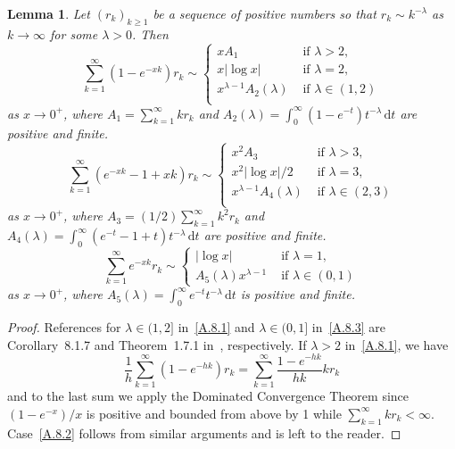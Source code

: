 \documentclass[11pt]{article}
\newtheorem{lemm}[theo]{Lemma}
\theoremstyle{definition}
\numberwithin{equation}{section}
\numberwithin{figure}{section}
\numberwithin{table}{section}
\newcommand{\gl}{\lambda}
\newcommand{\dd}{\mathrm{d}}
\begin{document}
\begin{lemm}\label{seriesAsymptotics}
Let $(r_k)_{k\ge1}$ be a sequence of positive numbers so that $r_k\sim k^{-\gl}$ as $k\to\infty$ for some $\gl>0$. Then
\begin{equation} \tag{i} \label{A.8.1}
\sum_{k=1}^\infty (1-e^{-xk})r _k\sim
\begin{cases} x A_1& \text{ if } \gl>2, \\
x |{\log x}| & \text{ if } \gl=2, \\
x^{\gl-1}A_2(\gl) & \text{ if } \gl\in(1, 2) \\
\end{cases}
\end{equation}
as $x\to 0^+$, where $A_1=\sum_{k=1}^\infty k r_k$ and $A_2(\gl)=\int_0^\infty (1-e^{-t}) t^{-\gl}\, \dd t$ are positive and finite.
\begin{equation} \tag{ii} \label{A.8.2}
\sum_{k=1}^\infty (e^{-xk}-1+xk) r_k\sim
\begin{cases} x^2 A_3& \text{ if } \gl>3, \\
x^2|{\log x}|/2 & \text{ if } \gl=3, \\
x^{\gl-1}A_4(\gl) & \text{ if } \gl\in(2, 3) \\
\end{cases}
\end{equation}
as $x\to 0^+$, where $A_3=(1/2)\sum_{k=1}^\infty k^2 r_k$ and $A_4(\gl)=\int_0^\infty (e^{-t}-1+t) t^{-\gl}\, \dd t$ are positive and finite.
\begin{equation} \tag{iii} \label{A.8.3}
\sum_{k=1}^\infty e^{-xk} r_k \sim
\begin{cases}
|{\log x}| & \text{ if } \gl = 1,\\[2pt] A_5(\gl) x^{\gl-1}& \text{ if } \gl \in (0,1)
\end{cases}
\end{equation}
as $x\to 0^+$, where $A_5(\gl)=\int_0^\infty e^{-t}t^{-\gl}\, \dd t$ is positive and finite.
\end{lemm}

\begin{proof}
References for $\gl\in (1,2]$ in~\eqref{A.8.1} and $\gl\in(0,1]$ in~\eqref{A.8.3} are Corollary~8.1.7 and Theorem~1.7.1 in~\cite{BGT89}, respectively. If $\gl>2$ in~\eqref{A.8.1}, we have
\[
\frac{1}{h}\sum_{k=1}^\infty (1-e^{-hk}) r_k=\sum_{k=1}^\infty \frac{1-e^{-hk}}{hk} k r_k
\]
and to the last sum we apply the Dominated Convergence Theorem since $(1-e^{-x})/x$ is positive and bounded from above by 1 while $\sum_{k=1}^\infty k r_k<\infty$. Case~\eqref{A.8.2} follows from similar arguments and is left to the reader.
\end{proof}
\end{document}
